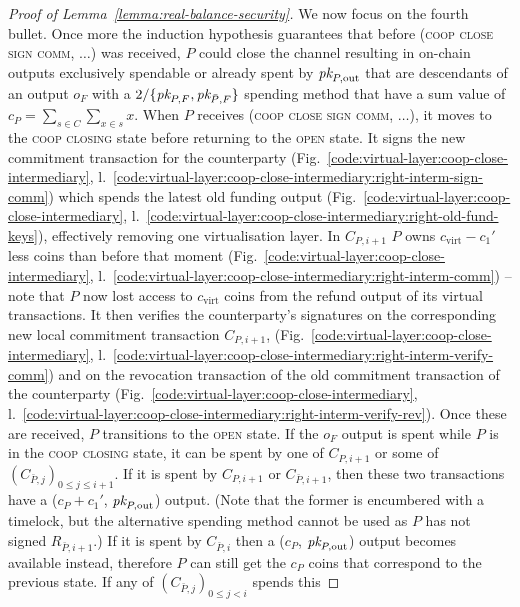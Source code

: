 \begin{proof}[Proof of Lemma~\ref{lemma:real-balance-security}]
  We now focus on the fourth bullet. Once more the induction hypothesis
  guarantees that before (\textsc{coop close sign comm}, $\dots$) was received,
  $P$ could close the channel resulting in on-chain outputs exclusively
  spendable or already spent by $\textit{pk}_{P, \mathrm{out}}$ that are descendants of
  an output $o_F$ with a $2/\{\textit{pk}_{P, F}, \textit{pk}_{\bar{P}, F}\}$ spending method that
  have a sum value of $c_P = \sum\limits_{s \in C} \sum\limits_{x \in s} x$.
  When $P$ receives (\textsc{coop close sign comm}, $\dots$), it moves to the
  \textsc{coop closing} state before returning to the \textsc{open} state. It
  signs the new commitment transaction for the counterparty
  (Fig.~\ref{code:virtual-layer:coop-close-intermediary},
  l.~\ref{code:virtual-layer:coop-close-intermediary:right-interm-sign-comm})
  which spends the latest old funding output
  (Fig.~\ref{code:virtual-layer:coop-close-intermediary},
  l.~\ref{code:virtual-layer:coop-close-intermediary:right-old-fund-keys}),
  effectively removing one virtualisation layer. In $C_{P, i+1}$ $P$ owns
  $c_{\mathrm{virt}} - c_1'$ less coins than before that moment
  (Fig.~\ref{code:virtual-layer:coop-close-intermediary},
  l.~\ref{code:virtual-layer:coop-close-intermediary:right-interm-comm}) -- note
  that $P$ now lost access to $c_{\mathrm{virt}}$ coins from the refund output
  of its virtual transactions. It then verifies the counterparty's signatures on
  the corresponding new local commitment transaction $C_{P, i+1}$,
  (Fig.~\ref{code:virtual-layer:coop-close-intermediary},
  l.~\ref{code:virtual-layer:coop-close-intermediary:right-interm-verify-comm})
  and on the revocation transaction of the old commitment transaction of the
  counterparty (Fig.~\ref{code:virtual-layer:coop-close-intermediary},
  l.~\ref{code:virtual-layer:coop-close-intermediary:right-interm-verify-rev}).
  Once these are received, $P$ transitions to the \textsc{open} state. If the
  $o_F$ output is spent while $P$ is in the \textsc{coop closing} state, it can
  be spent by one of $C_{P, i+1}$ or some of $(C_{\bar{P}, j})_{0 \leq j \leq
  i+1}$. If it is spent by $C_{P, i+1}$ or $C_{\bar{P}, i+1}$, then these two
  transactions have a ($c_P + c_1'$, $\textit{pk}_{P, \mathrm{out}}$) output. (Note that
  the former is encumbered with a timelock, but the alternative spending method
  cannot be used as $P$ has not signed $R_{\bar{P}, i+1}$.) If it is spent by
  $C_{\bar{P}, i}$ then a ($c_P$, $\textit{pk}_{P, \mathrm{out}}$) output becomes
  available instead, therefore $P$ can still get the $c_P$ coins that correspond
  to the previous state. If any of $(C_{\bar{P}, j})_{0 \leq j < i}$ spends this

\end{proof}
